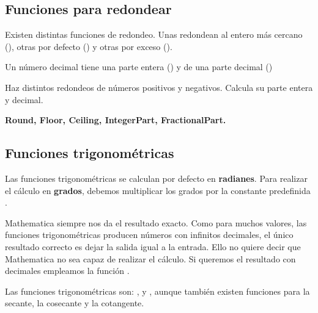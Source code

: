 \documentclass[a4paper,10pt, draft]{article}
\newcommand{\com}[1]{\textbf{\color{blue}{#1}}}
\newenvironment{ejer}{\begin{tcolorbox}[center title, title=Ejercicios,
fonttitle=\sffamily\bfseries,colback=blue!5,colframe=orange]}{\end{tcolorbox}}
\newenvironment{funciones}{\begin{tcolorbox}[center title, title=Nuevas funciones, fonttitle=\sffamily\bfseries, colback=green!5!white,colframe=red!75!black]}{\end{tcolorbox}\bigskip}
\begin{document}
\newpage

\subsection{Funciones para \guillemotleft redondear\guillemotright}

Existen distintas funciones de redondeo. Unas redondean al entero más cercano (\com{Round[x]}), otras  por defecto (\com{Floor[x]}) y o\-tras por exceso (\com{Ceiling[x]}). 

Un número decimal tiene una parte entera (\com{IntegerPart[x]}) y de una parte decimal (\com{FractionalPart[x]})


\begin{ejer}

Haz distintos redondeos de números positivos y negativos. Calcula su parte entera y decimal.

\end{ejer}


\begin{funciones}

\textbf{Round, Floor, Ceiling, IntegerPart, FractionalPart.}


\end{funciones}



\newpage

\subsection{Funciones trigonométricas}

Las funciones trigonométricas se calculan por defecto en \textbf{radianes}. Para realizar el cálculo en \textbf{grados}, debemos multiplicar los grados por la constante predefinida \com{Degree}. 

Mathematica siempre nos da el resultado exacto. Como para muchos valores, las funciones trigonométricas producen números con infinitos decimales, el único resultado correcto es dejar la salida igual a la entrada. Ello no quiere decir que Mathematica no sea capaz de realizar el cálculo. Si queremos el resultado con decimales empleamos la función \com{N[x]}.

Las funciones trigonométricas son: \com{Sin[x]}, \com{Cos[x]} y \com{Tan[x]}, aunque también existen funciones para la secante, la cosecante y la cotangente.
 
\end{document}

